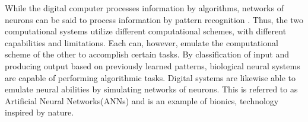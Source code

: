 
%
%





	While the digital computer processes information by algorithms, networks of neurons can be said to process information by pattern recognition \cite{TrevesNeuralNetworks}. 
	Thus, the two computational systems utilize different computational schemes, with different capabilities and limitations.
	Each can, however, emulate the computational scheme of the other to accomplish certain tasks.
	By classification of input and producing output based on previously learned patterns, biological neural systems are capable of performing algorithmic tasks. 
	Digital systems are likewise able to emulate neural abilities by simulating networks of neurons. %
	This is referred to as Artificial Neural Networks(ANNs) and is an example of bionics, technology inspired by nature.


